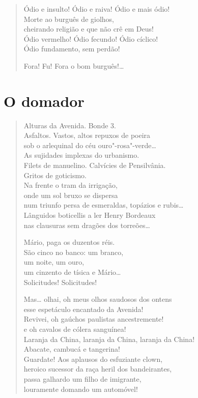 \begin{verse}
Ódio e insulto! Ódio e raiva! Ódio e mais ódio!\\
Morte ao burguês de giolhos,\\
cheirando religião e que não crê em Deus!\\
Ódio vermelho! Ódio fecundo! Ódio cíclico!\\
Ódio fundamento, sem perdão!

Fora! Fu! Fora o bom burguês!\ldots{}
\end{verse}

\chapter{O domador}

\begin{verse}
Alturas da Avenida. Bonde 3.\\
Asfaltos. Vastos, altos repuxos de poeira\\
sob o arlequinal do céu ouro"-rosa"-verde\ldots{}\\
As sujidades implexas do urbanismo.\\
Filets de manuelino. Calvícies de Pensilvânia.\\
Gritos de goticismo.\\
Na frente o tram da irrigação,\\
onde um sol bruxo se dispersa\\
num triunfo persa de esmeraldas, topázios e rubis\ldots{}\\
Lânguidos boticellis a ler Henry Bordeaux\\
nas clausuras sem dragões dos torreões\ldots{}

Mário, paga os duzentos réis.\\
São cinco no banco: um branco,\\
um noite, um ouro,\\
um cinzento de tísica e Mário\ldots{}\\
Solicitudes! Solicitudes!

Mas\ldots{} olhai, oh meus olhos saudosos dos ontens\\
esse espetáculo encantado da Avenida!\\
Revivei, oh gaúchos paulistas ancestremente!\\
e oh cavalos de cólera sanguínea!\\
Laranja da China, laranja da China, laranja da China!\\
Abacate, cambucá e tangerina!\\
Guardate! Aos aplausos do esfuziante clown,\\
heroico sucessor da raça heril dos bandeirantes,\\
passa galhardo um filho de imigrante,\\
louramente domando um automóvel!
\end{verse}

